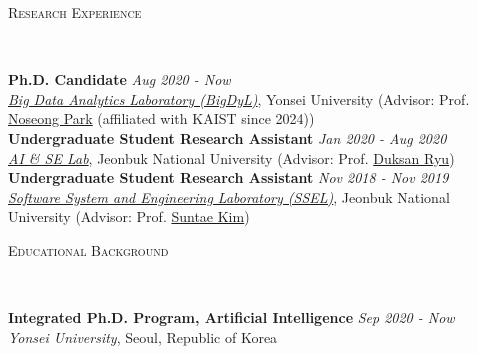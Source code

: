 \documentclass[10pt]{article}
\newenvironment{changemargin}[2]{
  \begin{list}{}{
    \setlength{\topsep}{0pt}
    \setlength{\leftmargin}{#1}
    \setlength{\rightmargin}{#2}
    \setlength{\listparindent}{\parindent}
    \setlength{\itemindent}{\parindent}
    \setlength{\parsep}{\parskip}
  }
  \item[]}{\end{list}
}
\newcommand{\lineover}{
	\begin{changemargin}{-0.05in}{-0.05in}
		\vspace*{-8pt}
		\hrulefill \\
		\vspace*{-2pt}
	\end{changemargin}
}
\newcommand{\header}[1]{
	\begin{changemargin}{-0.5in}{-0.5in}
		\scshape{#1}\\
  	\lineover
	\end{changemargin}
}
\newenvironment{body} {
	\vspace*{-16pt}
	\begin{changemargin}{-0.25in}{-0.5in}
  }
	{\end{changemargin}
}
\begin{document}
\header{Research Experience}
\begin{body}
	\vspace{14pt}
	\textbf{Ph.D. Candidate} \hfill \emph{Aug 2020 - Now} \\
	\emph{\href{https://sites.google.com/view/npark}{Big Data Analytics Laboratory (BigDyL)}}, Yonsei University (Advisor: Prof. {\href{https://scholar.google.com/citations?user=VSuM3gYAAAAJ&hl=en}{Noseong Park} (affiliated with KAIST since 2024)})  \\
	\textbf{Undergraduate Student Research Assistant} \hfill \emph{Jan 2020 - Aug 2020} \\
	\emph{\href{https://sites.google.com/view/aiselabjbnu}{AI \& SE Lab}}, Jeonbuk National University (Advisor: Prof. {\href{https://scholar.google.com/citations?user=BHue-MMAAAAJ&hl=en}{Duksan Ryu}})  \\
	\textbf{Undergraduate Student Research Assistant} \hfill \emph{Nov 2018 - Nov 2019} \\
	\emph{\href{https://sites.google.com/view/jbnussel/}{Software System and Engineering Laboratory (SSEL)}}, Jeonbuk National University (Advisor: Prof. {\href{https://scholar.google.com/citations?user=IN_HTKEAAAAJ&hl=en}{Suntae Kim}})  \\
\end{body}
\medskip

\header{Educational Background}

\begin{body}
	\vspace{14pt}
	\textbf{Integrated Ph.D. Program, Artificial Intelligence} \hfill \emph{Sep 2020 -  Now} \\
	\emph{Yonsei University}, Seoul, Republic of Korea \\
\end{body}
\end{document}
